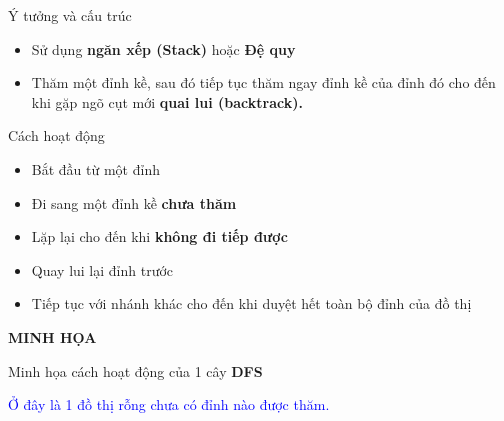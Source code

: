 \documentclass{beamer}
\begin{document}
\begin{frame}

    \begin{block}{Ý tưởng và cấu trúc}
        \begin{itemize}
            \item Sử dụng \textbf{ngăn xếp (Stack)} hoặc \textbf{Đệ quy}
            \item Thăm một đỉnh kề, sau đó tiếp tục thăm ngay đỉnh kề của đỉnh đó cho đến khi gặp ngõ cụt mới \textbf{quai lui (backtrack).}
        \end{itemize}
    \end{block}
    \pause
    \begin{exampleblock}{Cách hoạt động}
        \begin{itemize}
            \item Bắt đầu từ một đỉnh
            \item Đi sang một đỉnh kề \textbf{chưa thăm}
            \item Lặp lại cho đến khi \textbf{không đi tiếp được}
            \item Quay lui lại đỉnh trước
            \item Tiếp tục với nhánh khác cho đến khi duyệt hết toàn bộ đỉnh của đồ thị
        \end{itemize}
    \end{exampleblock}
\end{frame}

{
\begin{frame}{\textbf{MINH HỌA}}
    \begin{block}{Minh họa cách hoạt động của 1 cây \textbf{DFS}}
        \begin{center}

        \end{center}
    \end{block}
    \begin{center}
        \textcolor{blue}{Ở đây là 1 đồ thị rỗng chưa có đỉnh nào được thăm.}
    \end{center}
\end{frame}
}
\end{document}
